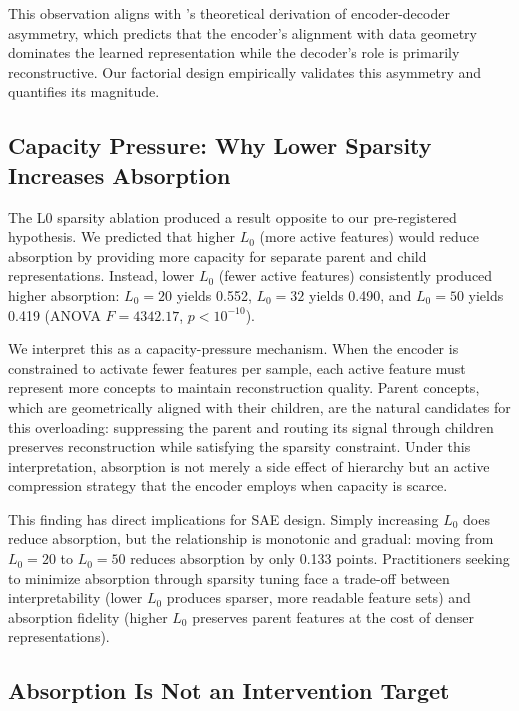\documentclass{article}
\begin{document}
This observation aligns with \citet{oursland2026}'s theoretical derivation of encoder-decoder asymmetry, which predicts that the encoder's alignment with data geometry dominates the learned representation while the decoder's role is primarily reconstructive. Our factorial design empirically validates this asymmetry and quantifies its magnitude.

\subsection{Capacity Pressure: Why Lower Sparsity Increases Absorption}

The L0 sparsity ablation produced a result opposite to our pre-registered hypothesis. We predicted that higher $L_0$ (more active features) would reduce absorption by providing more capacity for separate parent and child representations. Instead, lower $L_0$ (fewer active features) consistently produced higher absorption: $L_0 = 20$ yields 0.552, $L_0 = 32$ yields 0.490, and $L_0 = 50$ yields 0.419 (ANOVA $F = 4342.17$, $p < 10^{-10}$).

We interpret this as a capacity-pressure mechanism. When the encoder is constrained to activate fewer features per sample, each active feature must represent more concepts to maintain reconstruction quality. Parent concepts, which are geometrically aligned with their children, are the natural candidates for this overloading: suppressing the parent and routing its signal through children preserves reconstruction while satisfying the sparsity constraint. Under this interpretation, absorption is not merely a side effect of hierarchy but an active compression strategy that the encoder employs when capacity is scarce.

This finding has direct implications for SAE design. Simply increasing $L_0$ does reduce absorption, but the relationship is monotonic and gradual: moving from $L_0 = 20$ to $L_0 = 50$ reduces absorption by only 0.133 points. Practitioners seeking to minimize absorption through sparsity tuning face a trade-off between interpretability (lower $L_0$ produces sparser, more readable feature sets) and absorption fidelity (higher $L_0$ preserves parent features at the cost of denser representations).

\subsection{Absorption Is Not an Intervention Target}
\end{document}

